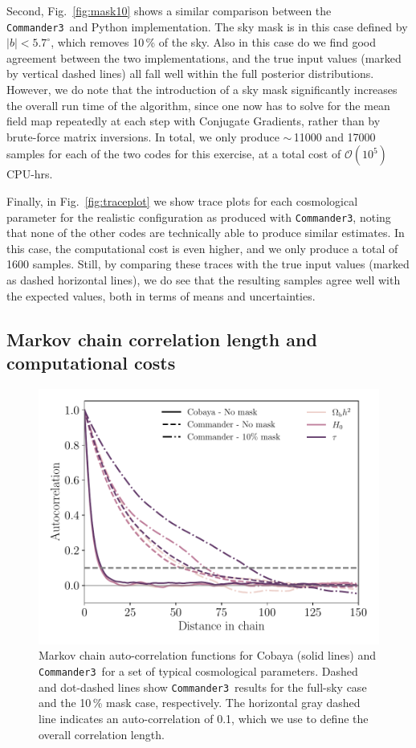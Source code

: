 \documentclass[twocolumn]{../common/aa}
\def\commanderthree{\texttt{Commander3}}
\begin{document}
Second, Fig.~\ref{fig:mask10} shows a similar comparison between the \commanderthree\ and Python implementation. The sky mask is in this case defined by $|b|<5.7^{\circ}$, which removes 10\,\% of the sky. Also in this case do we find good agreement between the two implementations, and the true input values (marked by vertical dashed lines) all fall well within the full posterior distributions. However, we do note that the introduction of a sky mask significantly increases the overall run time of the algorithm, since one now has to solve for the mean field map repeatedly at each step with Conjugate Gradients, rather than by brute-force matrix inversions. In total, we only produce $\sim$\,11000 and 17000 samples for each of the two codes for this exercise, at a total cost of $\mathcal{O}(10^5)$ CPU-hrs.

Finally, in Fig.~\ref{fig:traceplot} we show trace plots for each cosmological parameter for the realistic configuration as produced with \commanderthree, noting that none of the other codes are technically able to produce similar estimates. In this case, the computational cost is even higher, and we only produce a total of 1600 samples. Still, by comparing these traces with the true input values (marked as dashed horizontal lines), we do see that the resulting samples agree well with the expected values, both in terms of means and uncertainties. 

\subsection{Markov chain correlation length and computational costs}
\label{sec:resources}

\begin{figure}
	\centering
	\includegraphics[width=\linewidth]{figures/auto_correlation.pdf}
	\caption{\label{fig:autocorrelation}Markov chain auto-correlation functions for Cobaya (solid lines) and \commanderthree\ for a set of typical cosmological parameters. Dashed and dot-dashed lines show \commanderthree\ results for the full-sky case and the 10\,\% mask case, respectively. The horizontal gray dashed line indicates an auto-correlation of 0.1, which we use to define the overall correlation length.   }
\end{figure}
\end{document}
